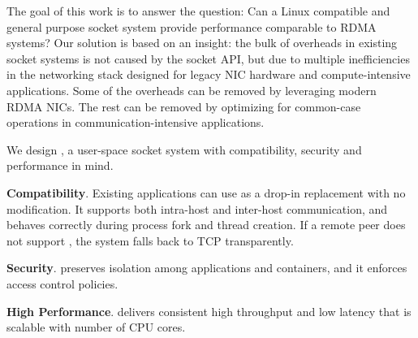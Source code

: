 
The goal of this work is to answer the question: Can a Linux compatible and general purpose socket system provide performance comparable to RDMA systems?
Our solution is based on an insight: the bulk of overheads in existing socket systems is not caused by the socket API, but due to multiple inefficiencies in the networking stack designed for legacy NIC hardware and compute-intensive applications.
Some of the overheads can be removed by leveraging modern RDMA NICs.
The rest can be removed by optimizing for common-case operations in communication-intensive applications.

We design \sys{}, a user-space socket system with compatibility, security and performance in mind.
\begin{ecompact}
	\item \textbf{Compatibility}.
	Existing applications can use \sys{} as a drop-in replacement with no modification.
	It supports both intra-host and inter-host communication, and behaves correctly during process fork and thread creation.
	If a remote peer does not support \sys{}, the system falls back to TCP transparently.
	\item \textbf{Security}.
	\sys{} preserves isolation among applications and containers, and it enforces access control policies.
	\item \textbf{High Performance}.
	\sys{} delivers consistent high throughput and low latency that is scalable with number of CPU cores.
\end{ecompact}





